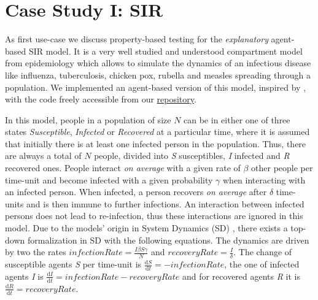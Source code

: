 \section{Case Study I: SIR}
\label{sec:case_SIR}
As first use-case we discuss property-based testing for the \textit{explanatory} agent-based SIR model. It is a very well studied and understood compartment model from epidemiology \cite{kermack_contribution_1927} which allows to simulate the dynamics of an infectious disease like influenza, tuberculosis, chicken pox, rubella and measles spreading through a population. We implemented an agent-based version of this model, inspired by , with the code freely accessible from our \href{https://github.com/thalerjonathan/haskell-sir}{repository}.

In this model, people in a population of size $N$ can be in either one of three states \textit{Susceptible}, \textit{Infected} or \textit{Recovered} at a particular time, where it is assumed that initially there is at least one infected person in the population. Thus, there are always a total of $N$ people, divided into \textit{S} susceptibles, \textit{I} infected and \textit{R} recovered ones. People interact \textit{on average} with a given rate of $\beta$ other people per time-unit and become infected with a given probability $\gamma$ when interacting with an infected person. When infected, a person recovers \textit{on average} after $\delta$ time-units and is then immune to further infections. An interaction between infected persons does not lead to re-infection, thus these interactions are ignored in this model. Due to the models' origin in System Dynamics (SD) \cite{porter_industrial_1962}, there exists a top-down formalization in SD with the following equations. The dynamics are driven by two the rates $infectionRate = \frac{I \beta S \gamma}{N}$ and $recoveryRate = \frac{I}{\delta}$. The change of susceptible agents \textit{S} per time-unit is $\frac{\mathrm d S}{\mathrm d t} = -infectionRate$, the one of infected agents \textit{I} is $\frac{\mathrm d I}{\mathrm d t} = infectionRate - recoveryRate$ and for recovered agents \textit{R} it is $\frac{\mathrm d R}{\mathrm d t} = recoveryRate$.

